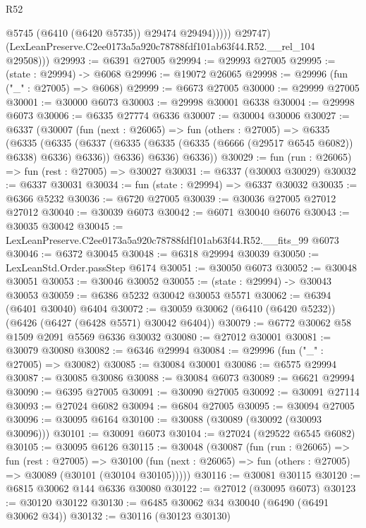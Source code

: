 \begin{lexlean}{R52}
\begin{coremodule}
                    @5745
                    (@6410 (@6420 @5735))
                    @29474
                    @29494)))))
          @29747)
        (LexLeanPreserve.C2ee0173a5a920c78788fdf101ab63f44.R52.__rel_104 @29508)))
@29993 := @6391 @27005
@29994 := @29993 @27005
@29995 := (state : @29994) -> @6068
@29996 := @19072 @26065
@29998 := @29996 (fun ("_" : @27005) => @6068)
@29999 := @6673 @27005
@30000 := @29999 @27005
@30001 := @30000 @6073
@30003 := @29998 @30001 @6338
@30004 := @29998 @6073
@30006 := @6335 @27774 @6336
@30007 := @30004 @30006
@30027 := @6337
    (@30007
      (fun (next : @26065) =>
      fun (others : @27005) =>
      @6335
        (@6335
          (@6335
            (@6337 (@6335 (@6335 (@6335 (@6666 (@29517 @6545 @6082)) @6338) @6336) @6336))
            @6336)
          @6336)
        @6336))
@30029 := fun (run : @26065) => fun (rest : @27005) => @30027
@30031 := @6337 (@30003 @30029)
@30032 := @6337 @30031
@30034 := fun (state : @29994) => @6337 @30032
@30035 := @6366 @5232
@30036 := @6720 @27005
@30039 := @30036 @27005 @27012 @27012
@30040 := @30039 @6073
@30042 := @6071 @30040 @6076
@30043 := @30035 @30042
@30045 := LexLeanPreserve.C2ee0173a5a920c78788fdf101ab63f44.R52.__fits_99 @6073
@30046 := @6372 @30045
@30048 := @6318 @29994 @30039
@30050 := LexLeanStd.Order.passStep @6174
@30051 := @30050 @6073
@30052 := @30048 @30051
@30053 := @30046 @30052
@30055 := (state : @29994) -> @30043 @30053
@30059 := @6386 @5232 @30042 @30053 @5571
@30062 := @6394 (@6401 @30040) @6404
@30072 := @30059 @30062 (@6410 (@6420 @5232)) (@6426 (@6427 (@6428 @5571) @30042 @6404))
@30079 := @6772 @30062 @58 @1509 @2091 @5569 @6336 @30032
@30080 := @27012 @30001
@30081 := @30079 @30080
@30082 := @6346 @29994
@30084 := @29996 (fun ("_" : @27005) => @30082)
@30085 := @30084 @30001
@30086 := @6575 @29994
@30087 := @30085 @30086
@30088 := @30084 @6073
@30089 := @6621 @29994
@30090 := @6395 @27005
@30091 := @30090 @27005
@30092 := @30091 @27114
@30093 := @27024 @6082
@30094 := @6804 @27005
@30095 := @30094 @27005
@30096 := @30095 @6164
@30100 := @30088 (@30089 (@30092 (@30093 @30096)))
@30101 := @30091 @6073
@30104 := @27024 (@29522 @6545 @6082)
@30105 := @30095 @6126
@30115 := @30048
    (@30087
      (fun (run : @26065) =>
      fun (rest : @27005) =>
      @30100 (fun (next : @26065) => fun (others : @27005) => @30089 (@30101 (@30104 @30105)))))
@30116 := @30081 @30115
@30120 := @6815 @30062 @144 @6336 @30080
@30122 := @27012 (@30095 @6073)
@30123 := @30120 @30122
@30130 := @6485 @30062 @34 @30040 (@6490 (@6491 @30062 @34))
@30132 := @30116 (@30123 @30130)

\end{coremodule}
\end{lexlean}
